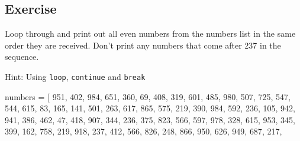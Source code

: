 \documentclass[11pt]{article}
\newenvironment{Shaded}{}{}
\newcommand{\DecValTok}[1]{\textcolor[rgb]{0.25,0.63,0.44}{{#1}}}
\newcommand{\NormalTok}[1]{{#1}}
\newcommand{\OperatorTok}[1]{\textcolor[rgb]{0.40,0.40,0.40}{{#1}}}
\begin{document}
    \subsection{Exercise}\label{exercise}

Loop through and print out all even numbers from the numbers list in the
same order they are received. Don't print any numbers that come after
237 in the sequence.

Hint: Using \texttt{loop}, \texttt{continue} and \texttt{break}

\begin{Shaded}
\begin{Highlighting}[]

\NormalTok{numbers }\OperatorTok{=}\NormalTok{ [}
    \DecValTok{951}\NormalTok{, }\DecValTok{402}\NormalTok{, }\DecValTok{984}\NormalTok{, }\DecValTok{651}\NormalTok{, }\DecValTok{360}\NormalTok{, }\DecValTok{69}\NormalTok{, }\DecValTok{408}\NormalTok{, }\DecValTok{319}\NormalTok{, }\DecValTok{601}\NormalTok{, }\DecValTok{485}\NormalTok{, }\DecValTok{980}\NormalTok{, }\DecValTok{507}\NormalTok{, }\DecValTok{725}\NormalTok{, }\DecValTok{547}\NormalTok{, }\DecValTok{544}\NormalTok{,}
    \DecValTok{615}\NormalTok{, }\DecValTok{83}\NormalTok{, }\DecValTok{165}\NormalTok{, }\DecValTok{141}\NormalTok{, }\DecValTok{501}\NormalTok{, }\DecValTok{263}\NormalTok{, }\DecValTok{617}\NormalTok{, }\DecValTok{865}\NormalTok{, }\DecValTok{575}\NormalTok{, }\DecValTok{219}\NormalTok{, }\DecValTok{390}\NormalTok{, }\DecValTok{984}\NormalTok{, }\DecValTok{592}\NormalTok{, }\DecValTok{236}\NormalTok{, }\DecValTok{105}\NormalTok{, }\DecValTok{942}\NormalTok{, }\DecValTok{941}\NormalTok{,}
    \DecValTok{386}\NormalTok{, }\DecValTok{462}\NormalTok{, }\DecValTok{47}\NormalTok{, }\DecValTok{418}\NormalTok{, }\DecValTok{907}\NormalTok{, }\DecValTok{344}\NormalTok{, }\DecValTok{236}\NormalTok{, }\DecValTok{375}\NormalTok{, }\DecValTok{823}\NormalTok{, }\DecValTok{566}\NormalTok{, }\DecValTok{597}\NormalTok{, }\DecValTok{978}\NormalTok{, }\DecValTok{328}\NormalTok{, }\DecValTok{615}\NormalTok{, }\DecValTok{953}\NormalTok{, }\DecValTok{345}\NormalTok{,}
    \DecValTok{399}\NormalTok{, }\DecValTok{162}\NormalTok{, }\DecValTok{758}\NormalTok{, }\DecValTok{219}\NormalTok{, }\DecValTok{918}\NormalTok{, }\DecValTok{237}\NormalTok{, }\DecValTok{412}\NormalTok{, }\DecValTok{566}\NormalTok{, }\DecValTok{826}\NormalTok{, }\DecValTok{248}\NormalTok{, }\DecValTok{866}\NormalTok{, }\DecValTok{950}\NormalTok{, }\DecValTok{626}\NormalTok{, }\DecValTok{949}\NormalTok{, }\DecValTok{687}\NormalTok{, }\DecValTok{217}\NormalTok{,}

\end{Highlighting}
\end{Shaded}
\end{document}

